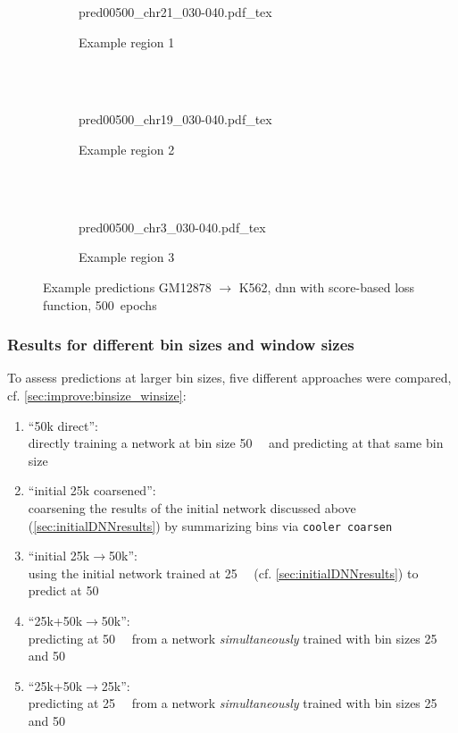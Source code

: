 \begin{figure}[p] %
    \begin{subfigure}{\textwidth}
        \centering
        \scriptsize
        {pred00500_chr21_030-040.pdf_tex}
        \caption{Example  region 1} \label{fig:results:scoreloss_r1}
    \end{subfigure}\\[2mm]
    \\[3mm]
    \begin{subfigure}{\textwidth}
        \centering
        \scriptsize
        {pred00500_chr19_030-040.pdf_tex}
        \caption{Example region 2} \label{fig:results:scoreloss_r2}
    \end{subfigure}\\[2mm]
    \\[3mm]
    \begin{subfigure}{\textwidth}
        \centering
        \scriptsize
        {pred00500_chr3_030-040.pdf_tex}
        \caption{Example region 3} \label{fig:results:scoreloss_r3}
    \end{subfigure}
    \caption{Example predictions GM12878 $\rightarrow$ K562,  \acrshort{dnn} with score-based loss function, 500~epochs} \label{fig:results:scoreloss_matrices}
\end{figure}

\subsubsection{Results for different bin sizes and window sizes} \label{sec:results:binsize_winsize}
To assess predictions at larger bin sizes, five different approaches were compared, cf. \cref{sec:improve:binsize_winsize}:
\begin{enumerate}
 \item ``50k direct'': \\directly training a network at bin size \SI{50}{\kilo\bp} and predicting at that same bin size
 \item ``initial 25k coarsened'': \\coarsening the results of the initial network discussed above (\cref{sec:initialDNNresults})
                    by summarizing bins via \texttt{cooler coarsen}
 \item ``initial 25k$\rightarrow$50k'': \\using the initial network trained at \SI{25}{\kilo\bp} (cf. \cref{sec:initialDNNresults}) to predict at \SI{50}{\kilo\bp}
 \item ``25k+50k$\rightarrow$50k'': \\predicting at \SI{50}{\kilo\bp} from a network \emph{simultaneously} trained with bin sizes 25 and \SI{50}{\kilo\bp}
 \item ``25k+50k$\rightarrow$25k'': \\predicting at \SI{25}{\kilo\bp} from a network \emph{simultaneously} trained with bin sizes 25 and \SI{50}{\kilo\bp}
\end{enumerate}

